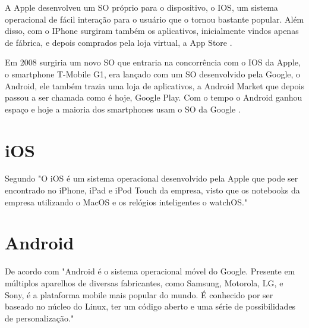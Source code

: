 A Apple desenvolveu um \ac{SO} próprio para o dispositivo, o IOS, um sistema operacional de fácil interação para o usuário que o tornou bastante popular. Além disso, com o  IPhone surgiram também os aplicativos, inicialmente vindos apenas de fábrica, e depois comprados pela loja virtual, a App Store \cite{historia_mobile}.

Em 2008 surgiria um novo \ac{SO} que entraria na concorrência com o IOS da Apple, o smartphone T-Mobile G1, era lançado com um \ac{SO} desenvolvido pela Google, o Android, ele também trazia uma loja de aplicativos, a Android Market que depois passou a ser chamada como é hoje, Google Play. Com o tempo o Android ganhou espaço e hoje a maioria dos smartphones usam o \ac{SO} da Google \cite{historia_android}.

\section{iOS}
Segundo \cite{ios} "O iOS é um sistema operacional desenvolvido pela Apple que pode ser encontrado no iPhone, iPad e iPod Touch da empresa, visto que os notebooks da empresa utilizando o MacOS e os relógios inteligentes o watchOS."

\section{Android}
De acordo com \cite{android} "Android é o sistema operacional móvel do Google. Presente em múltiplos aparelhos de diversas fabricantes, como Samsung, Motorola, LG, e Sony, é a plataforma mobile mais popular do mundo. É conhecido por ser baseado no núcleo do Linux, ter um código aberto e uma série de possibilidades de personalização."
\label{s_c3_historia}